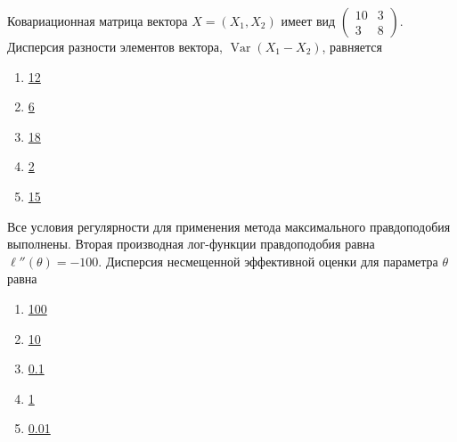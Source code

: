\documentclass[t]{beamer}
\DeclareMathOperator{\Var}{Var}
\begin{document}
 \begin{frame} \label{17} 
\begin{block}{17} 

Ковариационная матрица вектора $X=(X_1,X_2)$ имеет вид
$
\begin{pmatrix}
10 & 3 \\
3 & 8
\end{pmatrix}
$.
Дисперсия разности элементов вектора, $\Var(X_1-X_2)$, равняется
 


 \end{block} 
\begin{enumerate} 
\item[] \hyperlink{17-Yes}{\beamergotobutton{} 12}
\item[] \hyperlink{17-No}{\beamergotobutton{} 6}
\item[] \hyperlink{17-No}{\beamergotobutton{} 18}
\item[] \hyperlink{17-No}{\beamergotobutton{} 2}
\item[] \hyperlink{17-No}{\beamergotobutton{} 15}
\end{enumerate} 
\end{frame} 


 \begin{frame} \label{18} 
\begin{block}{18} 

Все условия регулярности для применения метода максимального правдоподобия выполнены. Вторая производная лог-функции правдоподобия равна $\ell''(\theta)=-100$. Дисперсия несмещенной эффективной оценки для параметра $\theta$ равна
 


 \end{block} 
\begin{enumerate} 
\item[] \hyperlink{18-No}{\beamergotobutton{} 100}
\item[] \hyperlink{18-No}{\beamergotobutton{} 10}
\item[] \hyperlink{18-No}{\beamergotobutton{} 0.1}
\item[] \hyperlink{18-No}{\beamergotobutton{} 1}
\item[] \hyperlink{18-Yes}{\beamergotobutton{} 0.01}
\end{enumerate} 
\end{frame} 
\end{document}
